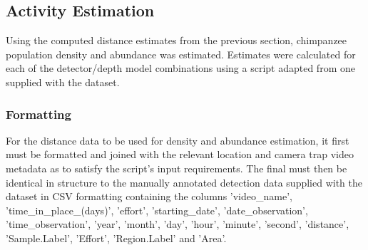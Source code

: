 \subsection{Activity Estimation}

Using the computed distance estimates from the previous section, chimpanzee population
density and abundance was estimated.
Estimates were calculated for each of the detector/depth model combinations using a
script adapted from one supplied with the dataset.

\subsubsection{Formatting}

For the distance data to be used for density and abundance estimation, it first must be
formatted and joined with the relevant location and camera trap video metadata as to
satisfy the script's input requirements.
The final must then be identical in structure to the manually annotated
detection data supplied with the dataset in CSV formatting containing the columns
'video\_name', 'time\_in\_place\_(days)', 'effort', 'starting\_date', 'date\_observation',
'time\_observation', 'year', 'month', 'day', 'hour', 'minute', 'second', 'distance', 'Sample.Label',
'Effort', 'Region.Label' and 'Area'.


